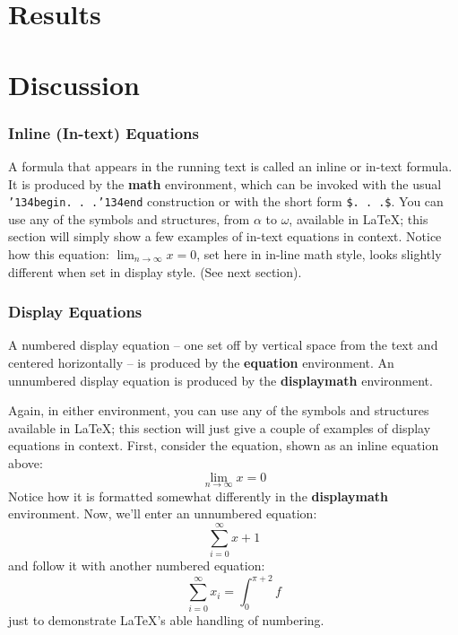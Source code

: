 \documentclass{acm_proc_article-sp}
\begin{document}
\section{Results}
\section{Discussion}

\subsubsection{Inline (In-text) Equations}
A formula that appears in the running text is called an
inline or in-text formula.  It is produced by the
\textbf{math} environment, which can be
invoked with the usual \texttt{{\char'134}begin. . .{\char'134}end}
construction or with the short form \texttt{\$. . .\$}. You
can use any of the symbols and structures,
from $\alpha$ to $\omega$, available in
\LaTeX\cite{Lamport:LaTeX}; this section will simply show a
few examples of in-text equations in context. Notice how
this equation: \begin{math}\lim_{n\rightarrow \infty}x=0\end{math},
set here in in-line math style, looks slightly different when
set in display style.  (See next section).

\subsubsection{Display Equations}
A numbered display equation -- one set off by vertical space
from the text and centered horizontally -- is produced
by the \textbf{equation} environment. An unnumbered display
equation is produced by the \textbf{displaymath} environment.

Again, in either environment, you can use any of the symbols
and structures available in \LaTeX; this section will just
give a couple of examples of display equations in context.
First, consider the equation, shown as an inline equation above:
\begin{equation}\lim_{n\rightarrow \infty}x=0\end{equation}
Notice how it is formatted somewhat differently in
the \textbf{displaymath}
environment.  Now, we'll enter an unnumbered equation:
\begin{displaymath}\sum_{i=0}^{\infty} x + 1\end{displaymath}
and follow it with another numbered equation:
\begin{equation}\sum_{i=0}^{\infty}x_i=\int_{0}^{\pi+2} f\end{equation}
just to demonstrate \LaTeX's able handling of numbering.
\end{document}
